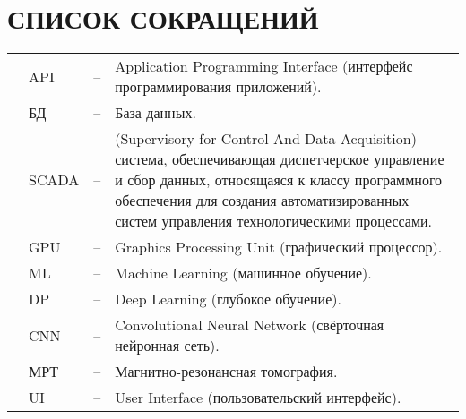 \sectionbreak \section*{ 
    \gostTitleFont
    \redline
    СПИСОК СОКРАЩЕНИЙ
}
\titlespace

{\gostFont

\begin{tabular}{p{0.85cm} p{1.75cm} p{0.3cm} p{131.5mm}}
    & API & {--} & Application Programming Interface (интерфейс программирования приложений). \\
    & БД & {--} & База данных. \\
    & SCADA & {--} & (Supervisory for Control And Data Acquisition) система, обеспечивающая диспетчерское управление и сбор данных, относящаяся к классу программного обеспечения для создания автоматизированных систем управления технологическими процессами. \\
    & GPU & {--} & Graphics Processing Unit (графический процессор). \\
    & ML & {--} & Machine Learning (машинное обучение). \\
    & DP & {--} & Deep Learning (глубокое обучение). \\
    & CNN & {--} & Convolutional Neural Network (свёрточная нейронная сеть). \\
    & МРТ & {--} & Магнитно-резонансная томография. \\
    & UI & {--} &  User Interface (пользовательский интерфейс). \\
\end{tabular}

}

